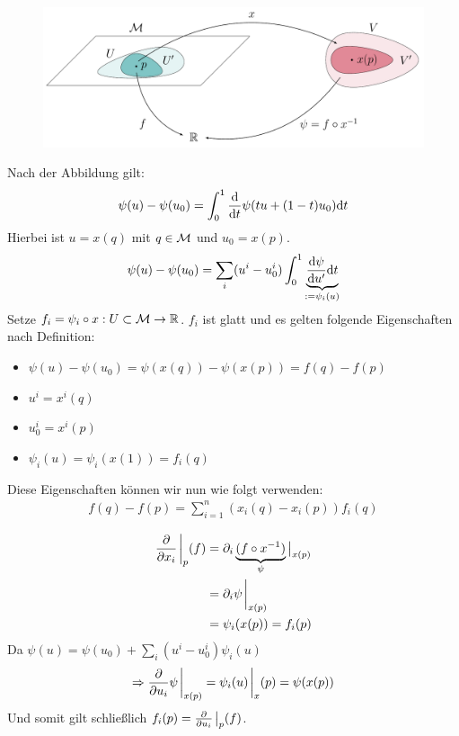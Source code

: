 \begin{bew} \leavevmode

\begin{figure}[H]
\centering
\includegraphics[width=1\linewidth]{figures/tikz/lemma_tangentialvectors.pdf}
\label{img:lemmaDarstellungBasisTPM}
\end{figure}

Nach der Abbildung gilt:
\begin{align}
\psi(u) - \psi(u_0) = \int^1_0 \dv{t} \psi(t u + (1- t) u_0) \dd t
\end{align}
Hierbei ist $u=x(q)$ mit $q \in \mathcal{M}$ und $u_0 = x(p)$.
\begin{align}
\psi(u) - \psi(u_0) = \sum_i (u^i- u^i_0) \int^1_0 \underbrace{\dv{\psi}{u'} (t u + (1 - t) u_0) \dd t}_{:= \psi_i (u)}
\end{align}
Setze $f_i = \psi_i \circ x : U \subset \mathcal{M} \to \mathbb{R}$.
$f_i$ ist glatt und es gelten folgende Eigenschaften nach Definition:
\begin{itemize}
\item $\psi(u)- \psi(u_0) = \psi(x(q)) - \psi(x(p)) = f(q)- f(p)$
\item $u^i = x^i (q)$
\item $u_0^i = x^i(p)$
\item $\psi_i (u) = \psi_i (x(1)) = f_i(q)$
\end{itemize}
Diese Eigenschaften können wir nun wie folgt verwenden:
\begin{align}
f(q)- f(p) = \sum_{i=1}^n (x_i (q) - x_i (p)) f_i(q)
\end{align}

\begin{align}
\pdv{x_i}\eval_{p} (f) &= \partial_i \underbrace{(f \circ x^{-1})}_{\psi} \big \vert_{x(p)} \\
&= \partial_i \psi \eval_{x(p)}\\
&= \psi_i (x(p)) = f_i (p)
\end{align}
Da $\psi(u) = \psi(u_0) + \sum_i (u^i - u^i_0)\psi_i(u)$
\begin{align}
\Rightarrow \pdv{u_i} \psi \eval_{x(p)} = \psi_i(u) \eval_x(p) = \psi(x(p))
\end{align}
Und somit gilt schließlich $f_i (p) = \pdv{u_i} \eval_p (f)$.
\end{bew}

